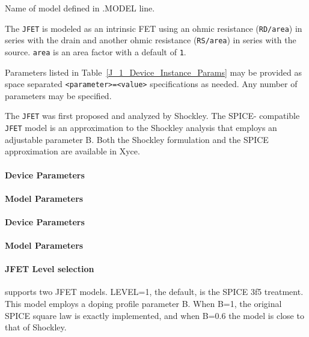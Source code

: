 \begin{Device}
\begin{Parameters}
Name of model defined in .MODEL line.


The \texttt{JFET} is modeled as an intrinsic FET using an ohmic
resistance (\texttt{RD/area}) in series with the drain and another ohmic
resistance (\texttt{RS/area}) in series with the source.  \texttt{area}
is an area factor with a default of \texttt{1}.


Parameters listed in Table~\ref{J_1_Device_Instance_Params} may be
provided as space separated \texttt{<parameter>=<value>} specifications
as needed.  Any number of parameters may be specified.

\end{Parameters}

\comments

The \texttt{JFET} was first proposed and analyzed by Shockley.  The
SPICE- compatible \texttt{JFET} model is an approximation to the
Shockley analysis that employs an adjustable parameter B.  Both the
Shockley formulation and the SPICE approximation are available in Xyce.

\end{Device}

\pagebreak

\paragraph{Device Parameters}


\paragraph{Model Parameters}


\pagebreak

\paragraph{Device Parameters}


\paragraph{Model Parameters}


\paragraph{JFET Level selection}
\Xyce{} supports two JFET models.  LEVEL=1, the default, is the SPICE 3f5
treatment.  This model employs a doping profile parameter B.  When B=1,
the original SPICE square law is exactly implemented, and when B=0.6 the
model is close to that of Shockley.

